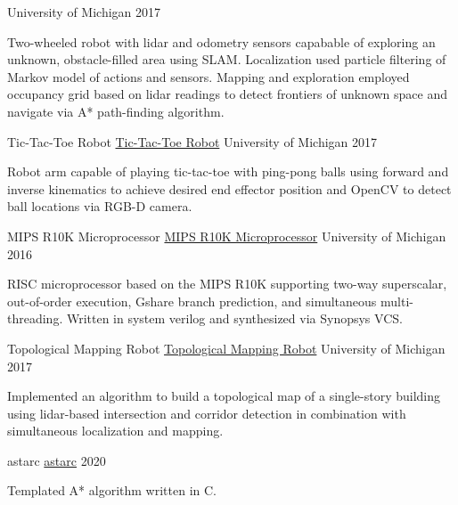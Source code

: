 \documentclass[11pt, a4paper]{cv}
\begin{document}
\begin{cv}
\begin{projects}
\begin{cventries}
{}
{University of Michigan}
{2017}
{\begin{cvparagraph}
Two-wheeled robot with lidar and odometry sensors capabable of exploring an unknown, obstacle-filled area using SLAM. Localization used particle filtering of Markov model of actions and sensors. Mapping and exploration employed occupancy grid based on lidar readings to detect frontiers of unknown space and navigate via A* path-finding algorithm.
\end{cvparagraph}}
\cventrycompact
{
{Tic-Tac-Toe Robot}
{\color{hrefblue}\href{https://drive.google.com/drive/folders/17dpGI2AZXLQeBZ3MueF8agzo8r2cehZu}{Tic-Tac-Toe Robot}}}
{}
{University of Michigan}
{2017}
{\begin{cvparagraph}
Robot arm capable of playing tic-tac-toe with ping-pong balls using forward and inverse kinematics to achieve desired end effector position and OpenCV to detect ball locations via RGB-D camera.
\end{cvparagraph}}
\cventrycompact
{
{MIPS R10K Microprocessor}
{\color{hrefblue}\href{https://drive.google.com/drive/folders/17iu4ip747moZ4sQQZMi77J8Z0gzI8UFG}{MIPS R10K Microprocessor}}}
{}
{University of Michigan}
{2016}
{\begin{cvparagraph}
RISC microprocessor based on the MIPS R10K supporting two-way superscalar, out-of-order execution, Gshare branch prediction, and simultaneous multi-threading. Written in system verilog and synthesized via Synopsys VCS.
\end{cvparagraph}}
\cventrycompact
{
{Topological Mapping Robot}
{\color{hrefblue}\href{https://drive.google.com/drive/folders/17\_EqmLftuGBope85FtokHQAA6ugtmVWc}{Topological Mapping Robot}}}
{}
{University of Michigan}
{2017}
{\begin{cvparagraph}
Implemented an algorithm to build a topological map of a single-story building using lidar-based intersection and corridor detection in combination with simultaneous localization and mapping.
\end{cvparagraph}}
\cventrycompact
{
{astarc}
{\color{hrefblue}\href{https://github.com/brandonmosher/astarc}{astarc}}}
{}
{}
{2020}
{\begin{cvparagraph}
Templated A* algorithm written in C.
\end{cvparagraph}}

\end{cventries}
\end{projects}
\end{cv}
\end{document}
